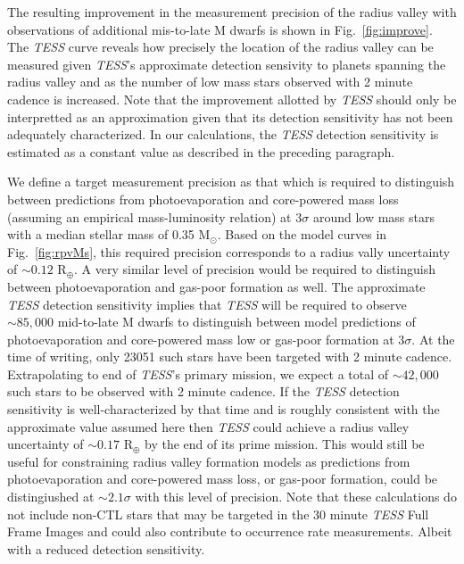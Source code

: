 \documentclass[twocolumn]{emulateapj}
\newcommand{\tess}[1]{\emph{TESS}#1}
\begin{document}
The resulting improvement in the measurement precision of the radius valley with observations of additional mis-to-late
M dwarfs is shown in Fig.~\ref{fig:improve}.
The \tess{} curve reveals how precisely the location of the radius valley can be measured given \tess{'s} approximate 
detection sensivity to planets spanning the radius valley and as the number of low mass stars observed with 2 minute
cadence is increased. Note that the improvement allotted by \tess{} should only be interpretted as an
approximation given that its detection sensitivity has not been adequately characterized. In our calculations, the
\tess{} detection sensitivity is estimated as a constant value as described in the preceding paragraph. 

We define a target measurement precision as that which is required to distinguish between predictions from photoevaporation
and core-powered mass loss (assuming an empirical mass-luminosity relation) at $3\sigma$ around low mass stars with a median
stellar mass of 0.35 M$_{\odot}$. Based on the model curves in Fig.~\ref{fig:rpvMs},
this required precision corresponds to a radius vally uncertainty of $\sim 0.12$ R$_{\oplus}$. A very similar level
of precision would be required to distinguish between photoevaporation and gas-poor formation as well.
The approximate \tess{} detection sensitivity implies that \tess{} will be required to observe $\sim 85,000$ mid-to-late M dwarfs
to distinguish between model predictions of photoevaporation and core-powered mass low or gas-poor formation at $3\sigma$.
At the time of writing, only 23051 such stars have been targeted with 2 minute cadence. Extrapolating to end of \tess{'s}
primary mission, we expect a total of $\sim 42,000$ such stars to be observed with 2 minute cadence. If the \tess{} detection
sensitivity is well-characterized by that time and is roughly consistent with the approximate value assumed here then \tess{}
could achieve a radius valley uncertainty of $\sim 0.17$ R$_{\oplus}$ by the end of its prime mission.
This would still be useful for constraining radius valley formation models as predictions from photoevaporation and
core-powered mass loss, or gas-poor formation, could be distingiushed at $\sim 2.1\sigma$ with this level of precision.
Note that these calculations do not include non-CTL stars that may be targeted in the 30 minute \tess{} Full Frame Images
and could also contribute to occurrence rate measurements. Albeit with a reduced detection sensitivity.
\end{document}
